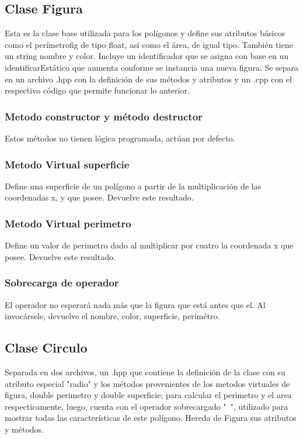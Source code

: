 \documentclass[11pt]{article}
\begin{document}
\subsection{Clase Figura}
	Esta es la clase base utilizada para los polígonos y define sus atributos básicos como el perímetrofig de tipo float, así como el área, de igual tipo. También tiene un string nombre y color. Incluye un identificador que se asigna con base en un identificarEstático que aumenta conforme se instancia una nueva figura. Se separa en un archivo .hpp con la definición de sus métodos y atributos y un .cpp con el respectivo código que permite funcionar lo anterior.

\subsubsection{Metodo constructor y método destructor}
	Estos métodos no tienen lógica programada, actúan por defecto.

\subsubsection{Metodo Virtual superficie}
	Define una superficie de un polígono a partir de la multiplicación de las coordenadas x, y que posee. Devuelve este resultado.

\subsubsection{Metodo Virtual perimetro}
	Define un valor de perimetro dado al multiplicar por cuatro la coordenada x que posee. Devuelve este resultado.

\subsubsection{Sobrecarga de operador ~}
	El operador no esperará nada más que la figura que está antes que el. Al invocársele, devuelve el nombre, color, superficie, perimétro.


\subsection{Clase Circulo}
	
	Separada en dos archivos, un .hpp que contiene la definición de la clase con su atributo especial "radio" y los métodos provenientes de los metodos virtuales de figura, double perimetro y double superficie; para calcular el perimetro y el area respecticamente, luego, cuenta con el operador sobrecargado "~", utilizado para mostrar todas las características de este polígono. Hereda de Figura sus atributos y métodos.
\end{document}
